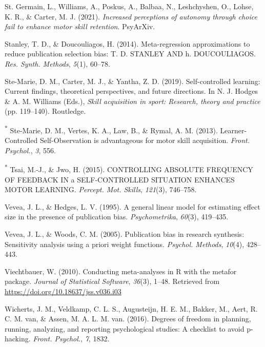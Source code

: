 \documentclass[
  english,
  man,floatsintext]{apa7}
\newlength{\cslhangindent}
\newlength{\cslentryspacingunit} %
\newenvironment{CSLReferences}[2] %
 {%
  \setlength{\parindent}{0pt}
  \ifodd #1
  \let\oldpar\par
  \def\par{\hangindent=\cslhangindent\oldpar}
  \fi
  \setlength{\parskip}{#2\cslentryspacingunit}
 }%
 {}
\begin{document}
\begin{CSLReferences}{1}{0}
\leavevmode{}%
St. Germain, L., Williams, A., Poskus, A., Balbaa, N., Leshchyshen, O., Lohse, K. R., \& Carter, M. J. (2021). \emph{Increased perceptions of autonomy through choice fail to enhance motor skill retention}. PsyArXiv.

\leavevmode{}%
Stanley, T. D., \& Doucouliagos, H. (2014). Meta-regression approximations to reduce publication selection bias: T. D. {STANLEY} {AND} h. {DOUCOULIAGOS}. \emph{Res. Synth. Methods}, \emph{5}(1), 60--78.

\leavevmode{}%
Ste-Marie, D. M., Carter, M. J., \& Yantha, Z. D. (2019). Self-controlled learning: Current findings, theoretical perspectives, and future directions. In N. J. Hodges \& A. M. Williams (Eds.), \emph{Skill acquisition in sport: Research, theory and practice} (pp. 119--140). Routledge.

\leavevmode{}%
\textsuperscript{*} Ste-Marie, D. M., Vertes, K. A., Law, B., \& Rymal, A. M. (2013). {Learner-Controlled} {Self-Observation} is advantageous for motor skill acquisition. \emph{Front. Psychol.}, \emph{3}, 556.

\leavevmode{}%
\textsuperscript{*} Tsai, M.-J., \& Jwo, H. (2015). {CONTROLLING} {ABSOLUTE} {FREQUENCY} {OF} {FEEDBACK} {IN} a {SELF-CONTROLLED} {SITUATION} {ENHANCES} {MOTOR} {LEARNING}. \emph{Percept. Mot. Skills}, \emph{121}(3), 746--758.

\leavevmode{}%
Vevea, J. L., \& Hedges, L. V. (1995). A general linear model for estimating effect size in the presence of publication bias. \emph{Psychometrika}, \emph{60}(3), 419--435.

\leavevmode{}%
Vevea, J. L., \& Woods, C. M. (2005). Publication bias in research synthesis: Sensitivity analysis using a priori weight functions. \emph{Psychol. Methods}, \emph{10}(4), 428--443.

\leavevmode{}%
Viechtbauer, W. (2010). Conducting meta-analyses in {R} with the {metafor} package. \emph{Journal of Statistical Software}, \emph{36}(3), 1--48. Retrieved from \url{https://doi.org/10.18637/jss.v036.i03}

\leavevmode{}%
Wicherts, J. M., Veldkamp, C. L. S., Augusteijn, H. E. M., Bakker, M., Aert, R. C. M. van, \& Assen, M. A. L. M. van. (2016). Degrees of freedom in planning, running, analyzing, and reporting psychological studies: A checklist to avoid p-hacking. \emph{Front. Psychol.}, \emph{7}, 1832.


\end{CSLReferences}
\end{document}
